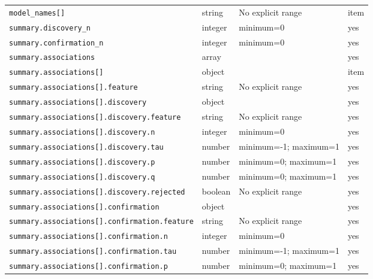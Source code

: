 \begin{longtable}{@{}p{}p{}p{}p{}@{}}
\texttt{model\_\allowbreak{}names[]} & string & No explicit range & item\\
\texttt{summary.\allowbreak{}discovery\_\allowbreak{}n} & integer & minimum=0 & yes\\
\texttt{summary.\allowbreak{}confirmation\_\allowbreak{}n} & integer & minimum=0 & yes\\
\texttt{summary.\allowbreak{}associations} & array &  & yes\\
\texttt{summary.\allowbreak{}associations[]} & object &  & item\\
\texttt{summary.\allowbreak{}associations[].\allowbreak{}feature} & string & No explicit range & yes\\
\texttt{summary.\allowbreak{}associations[].\allowbreak{}discovery} & object &  & yes\\
\texttt{summary.\allowbreak{}associations[].\allowbreak{}discovery.\allowbreak{}feature} & string & No explicit range & yes\\
\texttt{summary.\allowbreak{}associations[].\allowbreak{}discovery.\allowbreak{}n} & integer & minimum=0 & yes\\
\texttt{summary.\allowbreak{}associations[].\allowbreak{}discovery.\allowbreak{}tau} & number & minimum=-1; maximum=1 & yes\\
\texttt{summary.\allowbreak{}associations[].\allowbreak{}discovery.\allowbreak{}p} & number & minimum=0; maximum=1 & yes\\
\texttt{summary.\allowbreak{}associations[].\allowbreak{}discovery.\allowbreak{}q} & number & minimum=0; maximum=1 & yes\\
\texttt{summary.\allowbreak{}associations[].\allowbreak{}discovery.\allowbreak{}rejected} & boolean & No explicit range & yes\\
\texttt{summary.\allowbreak{}associations[].\allowbreak{}confirmation} & object &  & yes\\
\texttt{summary.\allowbreak{}associations[].\allowbreak{}confirmation.\allowbreak{}feature} & string & No explicit range & yes\\
\texttt{summary.\allowbreak{}associations[].\allowbreak{}confirmation.\allowbreak{}n} & integer & minimum=0 & yes\\
\texttt{summary.\allowbreak{}associations[].\allowbreak{}confirmation.\allowbreak{}tau} & number & minimum=-1; maximum=1 & yes\\
\texttt{summary.\allowbreak{}associations[].\allowbreak{}confirmation.\allowbreak{}p} & number & minimum=0; maximum=1 & yes\\

\end{longtable}
